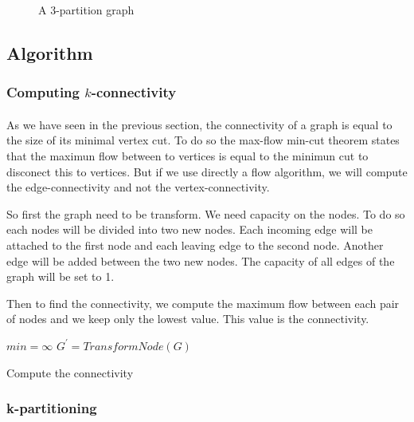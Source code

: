 \begin{figure}[!h]
    \begin{center}
        
    \end{center}
    \caption{A 3-partition graph}
\end{figure}

\subsection{Algorithm}
\subsubsection{Computing $k$-connectivity}
\paragraph{}
As we have seen in the previous section, the connectivity of a graph is equal to
the size of its minimal vertex cut.
To do so the max-flow min-cut theorem states that the maximun flow between to
vertices is equal to the minimun cut to disconect this to vertices.
But if we use directly a flow algorithm, we will compute the edge-connectivity
and not the vertex-connectivity.

So first the graph need to be transform. We need capacity on the nodes. To do so
each nodes will be divided into two new nodes. Each incoming edge will be
attached to the first node and each leaving edge to the second node. Another
edge will be added between the two new nodes.
The capacity of all edges of the graph will be set to 1.

Then to find the connectivity, we compute the maximum flow between each pair of
nodes and we keep only the lowest value. This value is the connectivity.


\begin{algorithm}[!h]
    $min = \infty$\;
    $G^{'} = TransformNode(G)$\;
    \;
    \caption{Compute the connectivity}
\end{algorithm}

\subsubsection{k-partitioning}
